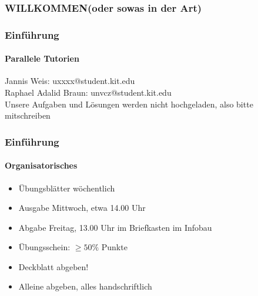 \documentclass{beamer}
\begin{document}
	\begin{frame}
		\frametitle{WILLKOMMEN(oder sowas in der Art)}
	\end{frame}
	\begin{frame}
		\frametitle{Einführung}
		\framesubtitle{Parallele Tutorien}
		Jannis Weis: uxxxx@student.kit.edu\\ %
		Raphael Adalid Braun: unvcz@student.kit.edu\\
		Unsere Aufgaben und Lösungen werden nicht hochgeladen, also bitte mitschreiben
	\end{frame}
	\begin{frame}
		\frametitle{Einführung}
		\framesubtitle{Organisatorisches}
		\begin{itemize}
			\item Übungsblätter wöchentlich
			\item Ausgabe Mittwoch, etwa 14.00 Uhr
			\item Abgabe Freitag, 13.00 Uhr im Briefkasten im Infobau
			\item Übungsschein: $\geq50\%$ Punkte
			\item Deckblatt abgeben!
			\item Alleine abgeben, alles handschriftlich
		\end{itemize}
	\end{frame}
\end{document}
